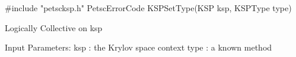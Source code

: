 #include "petscksp.h" 
PetscErrorCode  KSPSetType(KSP ksp, KSPType type)

Logically Collective on ksp

Input Parameters:
ksp : the Krylov space context
type : a known method

